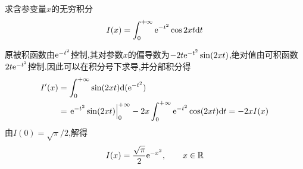 \documentclass{ctexart}
\begin{document}
\begin{problem}[7.(10\songti{分})]
求含参变量$x$的无穷积分
        \[I(x)=\int_0^{+\infty}\mathrm{e}^{-t^2}\cos 2xt\mathrm{d} t\]
\end{problem}
\begin{solution}
原被积函数由$\mathrm{e}^{-t^2}$控制,其对参数$x$的偏导数为$-2t\mathrm{e}^{-t^2}\sin(2xt)$,绝对值由可积函数$2t\mathrm{e}^{-t^2}$控制.因此可以在积分号下求导,并分部积分得
\[\begin{aligned}
I'(x)&=\int_0^{+\infty}\sin(2xt)\mathrm{d}(\mathrm{e}^{-t^2})\\
&=\left.\mathrm{e}^{-t^2}\sin(2xt)\right|_0^{+\infty}
-2x\int_0^{+\infty}\mathrm{e}^{-t^2}\cos(2xt)\mathrm{d} t=-2xI(x)
\end{aligned}\]
由$I(0)=\sqrt\pi/2$,解得
\[I(x)=\frac{\sqrt\pi}{2}\mathrm{e}^{-x^2},\qquad x\in\mathbb{R}\]
\end{solution}
\end{document}
